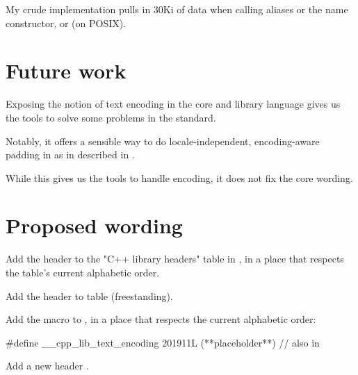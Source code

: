 \documentclass{wg21}
\begin{document}
My crude implementation pulls in 30Ki of data when calling aliases or the name constructor, or  (on POSIX).
\section{Future work}

Exposing the notion of text encoding in the core and library language gives us the tools to solve some
problems in the standard.

Notably, it offers a sensible way to do locale-independent, encoding-aware padding in  as in described in \cite{P1868}.

While this gives us the tools to handle encoding, it does not fix the core wording.

\newpage


\section{Proposed wording}

Add the header  to the "C++ library headers" table in
\tcode{[headers]}, in a place that respects the table’s current alphabetic
order.

Add the header  to table  (freestanding).

Add the macro  to , in a
place that respects the current alphabetic order:

\begin{codeblock}
#define __cpp_lib_text_encoding 201911L (**placeholder**) // also in 
\end{codeblock}

Add a new header .
\end{document}
